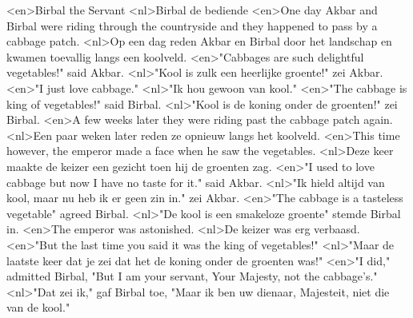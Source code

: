 <en>Birbal the Servant
<nl>Birbal de bediende
<en>One day Akbar and Birbal were riding through the countryside and they happened to pass by a cabbage patch.
<nl>Op een dag reden Akbar en Birbal door het landschap en kwamen toevallig langs een koolveld.
<en>"Cabbages are such delightful vegetables!" said Akbar.
<nl>"Kool is zulk een heerlijke groente!" zei Akbar.
<en>"I just love cabbage."
<nl>"Ik hou gewoon van kool."
<en>"The cabbage is king of vegetables!" said Birbal.
<nl>"Kool is de koning onder de groenten!" zei Birbal.
<en>A few weeks later they were riding past the cabbage patch again.
<nl>Een paar weken later reden ze opnieuw langs het koolveld.
<en>This time however, the emperor made a face when he saw the vegetables.
<nl>Deze keer maakte de keizer een gezicht toen hij de groenten zag.
<en>"I used to love cabbage but now I have no taste for it." said Akbar.
<nl>"Ik hield altijd van kool, maar nu heb ik er geen zin in." zei Akbar.
<en>"The cabbage is a tasteless vegetable" agreed Birbal.
<nl>"De kool is een smakeloze groente" stemde Birbal in.
<en>The emperor was astonished.
<nl>De keizer was erg verbaasd.
<en>"But the last time you said it was the king of vegetables!"
<nl>"Maar de laatste keer dat je zei dat het de koning onder de groenten was!"
<en>"I did," admitted Birbal, "But I am your servant, Your Majesty, not the cabbage's."
<nl>"Dat zei ik," gaf Birbal toe, "Maar ik ben uw dienaar, Majesteit, niet die van de kool."
